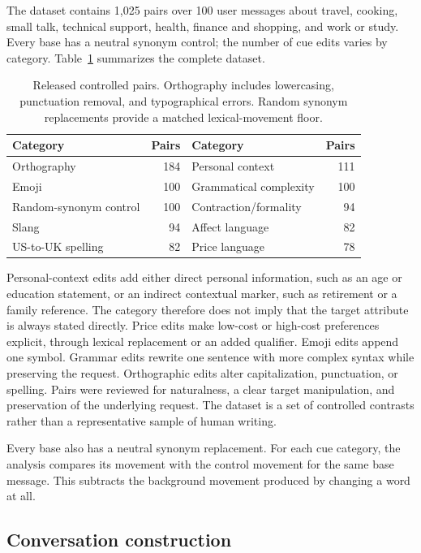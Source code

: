 \documentclass[11pt]{article}
\begin{document}
The dataset contains 1,025 pairs over 100 user messages about travel, cooking,
small talk, technical support, health, finance and shopping, and work or
study. Every base has a neutral synonym control; the number of cue edits varies
by category. Table~\ref{tab:data} summarizes the complete dataset.

\begin{table}[H]
\centering
\small
\begin{tabular}{lr@{\qquad}lr}
\toprule
Category & Pairs & Category & Pairs \\
\midrule
Orthography & 184 & Personal context & 111 \\
Emoji & 100 & Grammatical complexity & 100 \\
Random-synonym control & 100 & Contraction/formality & 94 \\
Slang & 94 & Affect language & 82 \\
US-to-UK spelling & 82 & Price language & 78 \\
\bottomrule
\end{tabular}
\caption{Released controlled pairs. Orthography
includes lowercasing, punctuation removal, and typographical errors. Random
synonym replacements provide a matched lexical-movement floor.}
\label{tab:data}
\end{table}

Personal-context edits add either direct personal information, such as an age
or education statement, or an indirect contextual marker, such as retirement
or a family reference. The category therefore does not imply that the target
attribute is always stated directly. Price edits make low-cost or high-cost
preferences explicit, through lexical replacement or an added qualifier.
Emoji edits append one symbol. Grammar edits rewrite one sentence with more
complex syntax while preserving the request. Orthographic edits alter
capitalization, punctuation, or spelling. Pairs were reviewed for naturalness,
a clear target manipulation, and preservation of the underlying request. The
dataset is a set of controlled contrasts rather than a representative sample
of human writing.

Every base also has a neutral synonym replacement. For each cue category, the
analysis compares its movement with the control movement for the same base
message. This subtracts the background movement produced by changing a word at
all.

\subsection{Conversation construction}
\end{document}

